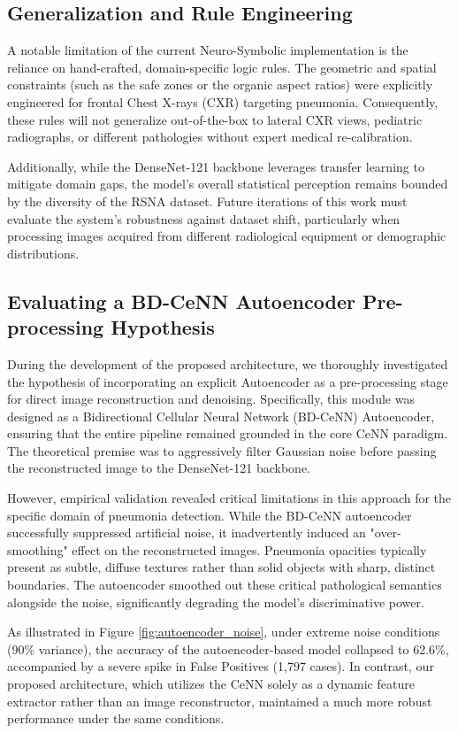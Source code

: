 \documentclass[a4paper,fleqn]{cas-dc}
\begin{document}
\subsection{Generalization and Rule Engineering}
A notable limitation of the current Neuro-Symbolic implementation is the reliance on hand-crafted, domain-specific logic rules. The geometric and spatial constraints (such as the safe zones or the organic aspect ratios) were explicitly engineered for frontal Chest X-rays (CXR) targeting pneumonia. Consequently, these rules will not generalize out-of-the-box to lateral CXR views, pediatric radiographs, or different pathologies without expert medical re-calibration.

Additionally, while the DenseNet-121 backbone leverages transfer learning to mitigate domain gaps, the model's overall statistical perception remains bounded by the diversity of the RSNA dataset. Future iterations of this work must evaluate the system's robustness against dataset shift, particularly when processing images acquired from different radiological equipment or demographic distributions.

\subsection{Evaluating a BD-CeNN Autoencoder Pre-processing Hypothesis}

During the development of the proposed architecture, we thoroughly investigated the hypothesis of incorporating an explicit Autoencoder as a pre-processing stage for direct image reconstruction and denoising. Specifically, this module was designed as a Bidirectional Cellular Neural Network (BD-CeNN) Autoencoder, ensuring that the entire pipeline remained grounded in the core CeNN paradigm. The theoretical premise was to aggressively filter Gaussian noise before passing the reconstructed image to the DenseNet-121 backbone.

However, empirical validation revealed critical limitations in this approach for the specific domain of pneumonia detection. While the BD-CeNN autoencoder successfully suppressed artificial noise, it inadvertently induced an "over-smoothing" effect on the reconstructed images. Pneumonia opacities typically present as subtle, diffuse textures rather than solid objects with sharp, distinct boundaries. The autoencoder smoothed out these critical pathological semantics alongside the noise, significantly degrading the model's discriminative power.

As illustrated in Figure \ref{fig:autoencoder_noise}, under extreme noise conditions (90\% variance), the accuracy of the autoencoder-based model collapsed to 62.6\%, accompanied by a severe spike in False Positives (1,797 cases). In contrast, our proposed architecture, which utilizes the CeNN solely as a dynamic feature extractor rather than an image reconstructor, maintained a much more robust performance under the same conditions.
\end{document}
